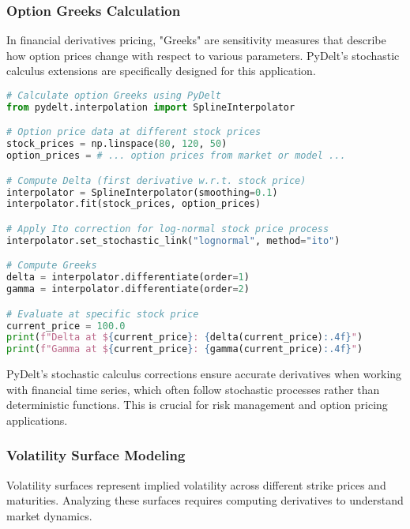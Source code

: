 \documentclass[11pt,a4paper]{article}
\begin{document}
\subsubsection{Option Greeks Calculation}

In financial derivatives pricing, "Greeks" are sensitivity measures that describe how option prices change with respect to various parameters. PyDelt's stochastic calculus extensions are specifically designed for this application.

\begin{lstlisting}[language=Python, caption=Option Greeks calculation example]
# Calculate option Greeks using PyDelt
from pydelt.interpolation import SplineInterpolator

# Option price data at different stock prices
stock_prices = np.linspace(80, 120, 50)
option_prices = # ... option prices from market or model ...

# Compute Delta (first derivative w.r.t. stock price)
interpolator = SplineInterpolator(smoothing=0.1)
interpolator.fit(stock_prices, option_prices)

# Apply Ito correction for log-normal stock price process
interpolator.set_stochastic_link("lognormal", method="ito")

# Compute Greeks
delta = interpolator.differentiate(order=1)
gamma = interpolator.differentiate(order=2)

# Evaluate at specific stock price
current_price = 100.0
print(f"Delta at ${current_price}: {delta(current_price):.4f}")
print(f"Gamma at ${current_price}: {gamma(current_price):.4f}")
\end{lstlisting}

PyDelt's stochastic calculus corrections ensure accurate derivatives when working with financial time series, which often follow stochastic processes rather than deterministic functions. This is crucial for risk management and option pricing applications.

\subsubsection{Volatility Surface Modeling}

Volatility surfaces represent implied volatility across different strike prices and maturities. Analyzing these surfaces requires computing derivatives to understand market dynamics.
\end{document}
